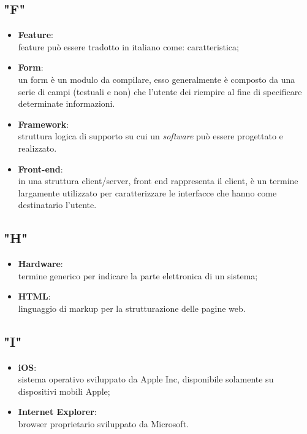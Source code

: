 \subsection{"F"}
\begin{itemize}
\item \textbf{Feature}:\\ feature può essere tradotto in italiano come: caratteristica;
\item \textbf{Form}:\\ un form è un modulo da compilare, esso generalmente è composto da una serie di campi (testuali e non) che l'utente dei riempire al fine di specificare determinate informazioni.
\item \textbf{Framework}:\\ struttura logica di supporto su cui un \textit{software} può essere progettato e realizzato.
\item \textbf{Front-end}:\\ in una struttura client/server, front end rappresenta il client, è un termine largamente utilizzato per caratterizzare le interfacce che hanno come destinatario l'utente.
\end{itemize}

\subsection{"H"}
\begin{itemize}
\item \textbf{Hardware}:\\ termine generico per indicare la parte elettronica di un sistema;
\item \textbf{HTML}:\\ linguaggio di markup per la strutturazione delle pagine web.
\end{itemize}

\subsection{"I"}
\begin{itemize}
\item \textbf{iOS}:\\ sistema operativo sviluppato da Apple Inc, disponibile solamente su dispositivi mobili Apple;
\item \textbf{Internet Explorer}:\\ browser proprietario sviluppato da Microsoft.
\end{itemize}

